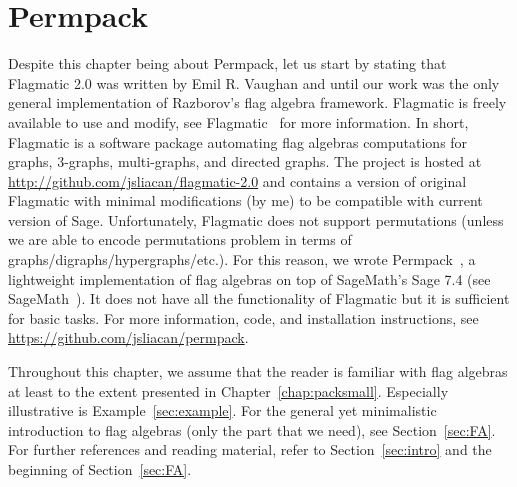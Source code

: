 \documentclass[12pt, a4paper, twoside]{report}
\begin{document}
\chapter{Permpack}
\label{chap:permpack}
%

Despite this chapter being about Permpack, let us start by stating that Flagmatic 2.0 was written by Emil R. Vaughan and until our work was the only general implementation of Razborov's flag algebra framework. Flagmatic is freely available to use and modify, see Flagmatic~\cite{flagmatic} for more information. In short, Flagmatic is a software package automating flag algebras computations for graphs, $3$-graphs, multi-graphs, and directed graphs. The project is hosted at \url{http://github.com/jsliacan/flagmatic-2.0} and contains a version of original Flagmatic with minimal modifications (by me) to be compatible with current version of Sage. Unfortunately, Flagmatic does not support permutations (unless we are able to encode permutations problem in terms of graphs/digraphs/hypergraphs/etc.). For this reason, we wrote Permpack~\cite{permpack}, a lightweight implementation of flag algebras on top of SageMath's Sage 7.4 (see SageMath~\cite{sagemath}). It does not have all the functionality of Flagmatic but it is sufficient for basic tasks. For more information, code, and installation instructions, see \url{https://github.com/jsliacan/permpack}. 

Throughout this chapter, we assume that the reader is familiar with flag algebras at least to the extent presented in Chapter~\ref{chap:packsmall}. Especially illustrative is Example~\ref{sec:example}. For the general yet minimalistic introduction to flag algebras (only the part that we need), see Section~\ref{sec:FA}. For further references and reading material, refer to Section~\ref{sec:intro} and the beginning of Section~\ref{sec:FA}.

\end{document}
